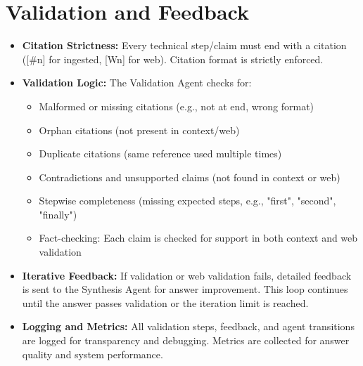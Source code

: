 \documentclass{article}
\begin{document}
\section*{Validation and Feedback}
\begin{itemize}[leftmargin=*, itemsep=0.5em]
  \item \textbf{Citation Strictness:} Every technical step/claim must end with a citation ([\#n] for ingested, [Wn] for web). Citation format is strictly enforced.
  \item \textbf{Validation Logic:} The Validation Agent checks for:
    \begin{itemize}
      \item Malformed or missing citations (e.g., not at end, wrong format)
      \item Orphan citations (not present in context/web)
      \item Duplicate citations (same reference used multiple times)
      \item Contradictions and unsupported claims (not found in context or web)
      \item Stepwise completeness (missing expected steps, e.g., "first", "second", "finally")
      \item Fact-checking: Each claim is checked for support in both context and web validation
    \end{itemize}
  \item \textbf{Iterative Feedback:} If validation or web validation fails, detailed feedback is sent to the Synthesis Agent for answer improvement. This loop continues until the answer passes validation or the iteration limit is reached.
  \item \textbf{Logging and Metrics:} All validation steps, feedback, and agent transitions are logged for transparency and debugging. Metrics are collected for answer quality and system performance.
\end{itemize}
\end{document}
